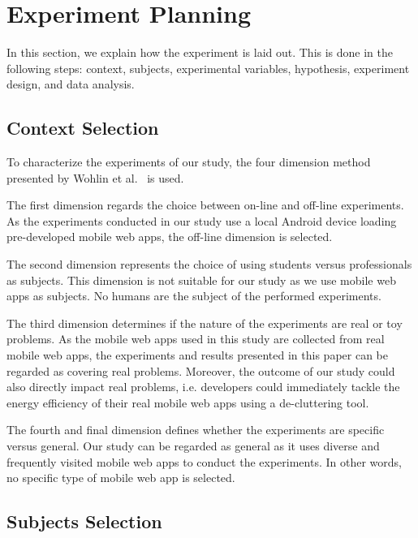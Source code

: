 \section{Experiment Planning}

In this section, we explain how the experiment is laid out. This is done in the following steps: context, subjects, experimental variables, hypothesis, experiment design, and data analysis.


\subsection{Context Selection}

To characterize the experiments of our study, the four dimension method presented by Wohlin et al.~\cite{wohlin2012experimentation} is used.  

The first dimension regards the choice between on-line and off-line experiments. As the experiments conducted in our study use a local Android device loading pre-developed mobile web apps, the off-line dimension is selected.

The second dimension represents the choice of using students versus professionals as subjects. This dimension is not suitable for our study as we use mobile web apps as subjects. No humans are the subject of the performed experiments.

The third dimension determines if the nature of the experiments are real or toy problems. As the mobile web apps used in this study are collected from real mobile web apps, the experiments and results presented in this paper can be regarded as covering real problems. Moreover, the outcome of our study could also directly impact real problems, i.e. developers could immediately tackle the energy efficiency of their real mobile web apps using a de-cluttering tool.

The fourth and final dimension defines whether the experiments are specific versus general. Our study can be regarded as general as it uses diverse and frequently visited mobile web apps to conduct the experiments. In other words, no specific type of mobile web app is selected.


\subsection{Subjects Selection}\label{subsec:subjects_selection} 

